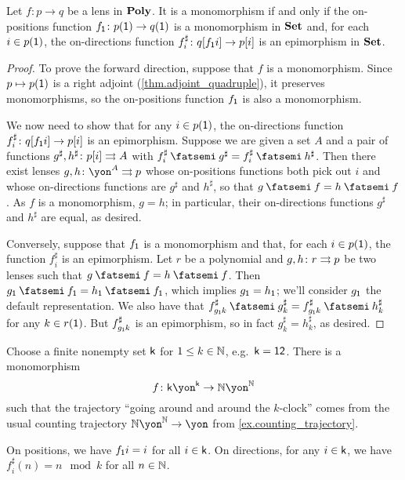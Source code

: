 \documentclass[Book-Poly]{subfiles}
\begin{document}
\begin{proposition}\label{prop.monics_in_poly}
Let $f \colon p \to q$ be a lens in $\mathbf{Poly}$. It is a monomorphism if and only if the on-positions function $f_{\textsf{1}} \colon p(\textsf{1}) \to q(\textsf{1})$ is a monomorphism in $\mathbf{Set}$ and, for each $i \in p(\textsf{1})$, the on-directions function $f^\sharp_i \colon q[f_{\textsf{1}}i]\to p[i]$ is an epimorphism in $\mathbf{Set}$.
\end{proposition}
\begin{proof}
To prove the forward direction, suppose that $f$ is a monomorphism.
Since $p\mapsto p(\textsf{1})$ is a right adjoint (\cref{thm.adjoint_quadruple}), it preserves monomorphisms, so the on-positions function $f_{\textsf{1}}$ is also a monomorphism.

We now need to show that for any $i\in p(\textsf{1})$, the on-directions function $f^\sharp_i \colon q[f_{\textsf{1}}i] \to p[i]$ is an epimorphism.
Suppose we are given a set $A$ and a pair of functions $g^\sharp,h^\sharp\colon p[i]\rightrightarrows A$ with $f^\sharp_i \then g^\sharp = f^\sharp_i \then h^\sharp$.
Then there exist lenses $g,h \colon \yon^A \tto p$ whose on-positions functions both pick out $i$ and whose on-directions functions are $g^\sharp$ and $h^\sharp$, so that $g \then f = h \then f$.
As $f$ is a monomorphism, $g = h$; in particular, their on-directions functions $g^\sharp$ and $h^\sharp$ are equal, as desired.

Conversely, suppose that $f_{\textsf{1}}$ is a monomorphism and that, for each $i\in p(\textsf{1})$, the function $f^\sharp_i$ is an epimorphism.
Let $r$ be a polynomial and $g,h\colon r\rightrightarrows p$ be two lenses such that $g \then f = h \then f$.
Then $g_\1 \then f_\1 = h_\1 \then f_\1$, which implies $g_{\textsf{1}} = h_{\textsf{1}}$; we'll consider $g_{\textsf{1}}$ the default representation.
We also have that $f^\sharp_{g_\1k} \then g^\sharp_k = f^\sharp_{g_\1k} \then h^\sharp_k$ for any $k \in r(\textsf{1})$. But $f^\sharp_{g_{\textsf{1}}k}$ is an epimorphism, so in fact $g^\sharp_k = h^\sharp_k$, as desired.
\end{proof}

\begin{example}\label{ex.clock_in_N}
Choose a finite nonempty set $\mathsf{k}$ for $1\leq k\in\mathbb{N}$, e.g.\ $\mathsf{k}=\textsf{1}\textsf{2}$. There is a monomorphism
\[
f \colon\ord{k}\yon^{\ord{k}}\to\nn\yon^\nn
\]
such that the trajectory ``going around and around the $k$-clock'' comes from the usual counting trajectory $\nn\yon^\nn\to\yon$ from \cref{ex.counting_trajectory}.

On positions, we have $f_{\textsf{1}}i=i$ for all $i \in \mathsf{k}$. On directions, for any $i \in \mathsf{k}$, we have $f^\sharp_i(n) = n \mod k$ for all $n \in \mathbb{N}$.
\end{example}
\end{document}
